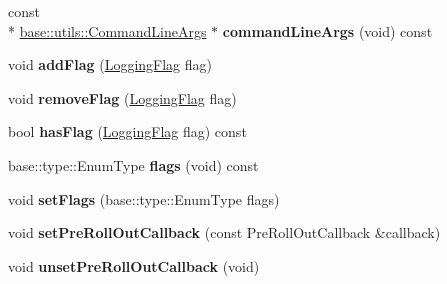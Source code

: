 \begin{DoxyCompactItemize}
\item 
\hypertarget{classel_1_1base_1_1Storage_a84f3d208bead8a8b2c15834be7f30f8d}{const \\*
\hyperlink{classel_1_1base_1_1utils_1_1CommandLineArgs}{base\-::utils\-::\-Command\-Line\-Args} $\ast$ {\bfseries command\-Line\-Args} (void) const }\label{classel_1_1base_1_1Storage_a84f3d208bead8a8b2c15834be7f30f8d}

\item 
\hypertarget{classel_1_1base_1_1Storage_a3e17c61961f3b2f45e8ec77e3320bed5}{void {\bfseries add\-Flag} (\hyperlink{namespaceel_a2784aacd04cb7816ac1c0b20fcbf83cb}{Logging\-Flag} flag)}\label{classel_1_1base_1_1Storage_a3e17c61961f3b2f45e8ec77e3320bed5}

\item 
\hypertarget{classel_1_1base_1_1Storage_aaecbb6ae954d0bf748ac7f3c980a9173}{void {\bfseries remove\-Flag} (\hyperlink{namespaceel_a2784aacd04cb7816ac1c0b20fcbf83cb}{Logging\-Flag} flag)}\label{classel_1_1base_1_1Storage_aaecbb6ae954d0bf748ac7f3c980a9173}

\item 
\hypertarget{classel_1_1base_1_1Storage_ab569cf6e09897b0520dee7f4d1fb742e}{bool {\bfseries has\-Flag} (\hyperlink{namespaceel_a2784aacd04cb7816ac1c0b20fcbf83cb}{Logging\-Flag} flag) const }\label{classel_1_1base_1_1Storage_ab569cf6e09897b0520dee7f4d1fb742e}

\item 
\hypertarget{classel_1_1base_1_1Storage_a0a8da674f034011c50b0479307677855}{base\-::type\-::\-Enum\-Type {\bfseries flags} (void) const }\label{classel_1_1base_1_1Storage_a0a8da674f034011c50b0479307677855}

\item 
\hypertarget{classel_1_1base_1_1Storage_a5df88c56b8d923c20568e50ceb0bdd64}{void {\bfseries set\-Flags} (base\-::type\-::\-Enum\-Type flags)}\label{classel_1_1base_1_1Storage_a5df88c56b8d923c20568e50ceb0bdd64}

\item 
\hypertarget{classel_1_1base_1_1Storage_a626165bc5c8808b733707294ce2a0dc8}{void {\bfseries set\-Pre\-Roll\-Out\-Callback} (const Pre\-Roll\-Out\-Callback \&callback)}\label{classel_1_1base_1_1Storage_a626165bc5c8808b733707294ce2a0dc8}

\item 
\hypertarget{classel_1_1base_1_1Storage_a2bfdc3a20eeafe158ee8603c805131e4}{void {\bfseries unset\-Pre\-Roll\-Out\-Callback} (void)}\label{classel_1_1base_1_1Storage_a2bfdc3a20eeafe158ee8603c805131e4}


\end{DoxyCompactItemize}
